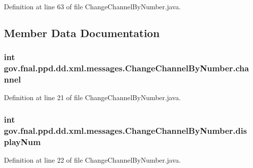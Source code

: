 Definition at line 63 of file Change\-Channel\-By\-Number.\-java.



\subsection{Member Data Documentation}
\hypertarget{classgov_1_1fnal_1_1ppd_1_1dd_1_1xml_1_1messages_1_1ChangeChannelByNumber_a172f59b68a3890f2033eec1b9fb53441}{
\subsubsection[{channel}]{\setlength{\rightskip}{0pt plus 5cm}int gov.\-fnal.\-ppd.\-dd.\-xml.\-messages.\-Change\-Channel\-By\-Number.\-channel\hspace{0.3cm}{\ttfamily [protected]}}}\label{classgov_1_1fnal_1_1ppd_1_1dd_1_1xml_1_1messages_1_1ChangeChannelByNumber_a172f59b68a3890f2033eec1b9fb53441}


Definition at line 21 of file Change\-Channel\-By\-Number.\-java.

\hypertarget{classgov_1_1fnal_1_1ppd_1_1dd_1_1xml_1_1messages_1_1ChangeChannelByNumber_ac7aaa8baec77d014e288b5a5eb5f5dff}{
\subsubsection[{display\-Num}]{\setlength{\rightskip}{0pt plus 5cm}int gov.\-fnal.\-ppd.\-dd.\-xml.\-messages.\-Change\-Channel\-By\-Number.\-display\-Num\hspace{0.3cm}{\ttfamily [protected]}}}\label{classgov_1_1fnal_1_1ppd_1_1dd_1_1xml_1_1messages_1_1ChangeChannelByNumber_ac7aaa8baec77d014e288b5a5eb5f5dff}


Definition at line 22 of file Change\-Channel\-By\-Number.\-java.

